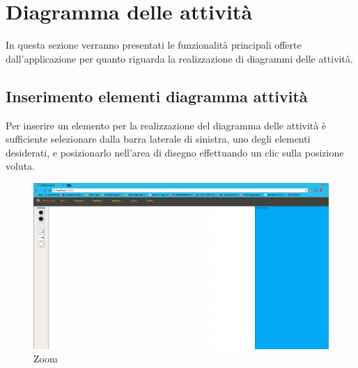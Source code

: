\section{Diagramma delle attività}
In questa sezione verranno presentati le funzionalità principali offerte dall'applicazione per quanto riguarda la realizzazione di diagrammi delle attività.

\subsection{Inserimento elementi diagramma attività}
Per inserire un elemento per la realizzazione del diagramma delle attività è sufficiente selezionare dalla barra laterale di sinistra, uno degli elementi desiderati, e posizionarlo nell'area di disegno effettuando un clic sulla posizione voluta.

\begin{figure}[h!]
	\centering
		\includegraphics[scale=1]{../img/editActivity.png}
	\caption{Zoom}
\end{figure}

